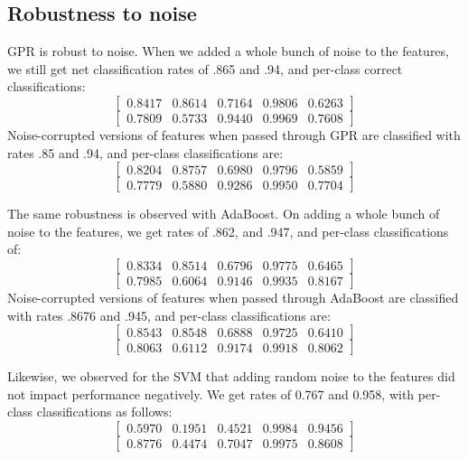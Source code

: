 \documentclass[letterpaper]{article}
\begin{document}
\subsection*{Robustness to noise}
GPR is robust to noise. When we added a whole bunch of noise to the features, we still get net classification rates of .865 and .94, and per-class correct classifications:
$$\begin{bmatrix} 0.8417 &   0.8614 &   0.7164   & 0.9806  &  0.6263\end{bmatrix}$$
$$\begin{bmatrix} 0.7809  &  0.5733  &  0.9440&    0.9969    &0.7608\end{bmatrix}$$
Noise-corrupted versions of features when passed through GPR are classified with rates .85 and .94, and per-class classifications are:
$$\begin{bmatrix} 0.8204  &  0.8757 &   0.6980  &  0.9796 &   0.5859\end{bmatrix}$$
$$\begin{bmatrix} 0.7779  &  0.5880  &  0.9286  &  0.9950 &   0.7704\end{bmatrix}$$

The same robustness is observed with AdaBoost. On adding a whole bunch of noise to the features, we get rates of .862, and .947, and per-class classifications of:
$$\begin{bmatrix} 0.8334 &   0.8514 &   0.6796  & 0.9775  &  0.6465\end{bmatrix}$$
$$\begin{bmatrix} 0.7985 &   0.6064   & 0.9146 &   0.9935 &   0.8167\end{bmatrix}$$
Noise-corrupted versions of features when passed through AdaBoost are classified with rates .8676 and .945, and per-class classifications are:
$$\begin{bmatrix} 0.8543 &   0.8548 &   0.6888&    0.9725  &  0.6410\end{bmatrix}$$
$$\begin{bmatrix} 0.8063  &  0.6112 &   0.9174  &  0.9918  &  0.8062\end{bmatrix}$$

Likewise, we observed for the SVM that adding random noise to the
features did not impact performance negatively. We get rates of 0.767
and 0.958, with per-class classifications as follows:
$$\begin{bmatrix} 0.5970    & 0.1951    & 0.4521    & 0.9984   & 0.9456\end{bmatrix}$$
$$\begin{bmatrix} 0.8776  &  0.4474  &  0.7047  &  0.9975  &  0.8608\end{bmatrix}$$
\end{document}
